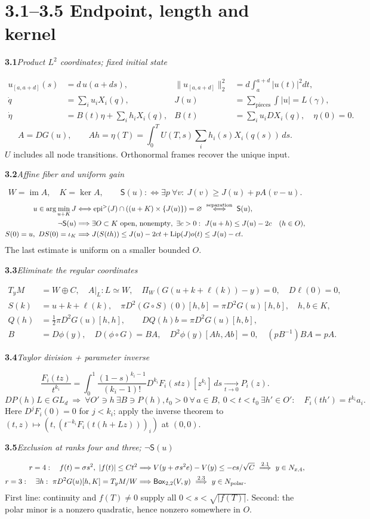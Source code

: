 \documentclass[11pt]{article}
\newcommand{\im}{\operatorname{im}}
\newcommand{\suppc}{\mathsf{S}}
\newcommand{\boxd}{\mathsf{Box}}
\newcommand{\rowhead}[2]{\par\medskip\noindent\textbf{#1}\quad\textit{#2}\par}
\newcommand{\newpart}[1]{\clearpage\section*{#1}}
\begin{document}
\newpart{3.1--3.5 \quad Endpoint, length and kernel}
\rowhead{3.1}{Product $L^2$ coordinates; fixed initial state}
\begin{align*}
 u_{[a,a+d]}(s)&=d\,u(a+ds),&
 \|u_{[a,a+d]}\|_2^2&=d\int_a^{a+d}|u(t)|^2dt,\\
 \dot q&=\sum_i u_iX_i(q),&
 J(u)&=\sum_{\mathrm{pieces}}\int |u|=L(\gamma),\\
 \dot\eta&=B(t)\eta+\sum_i h_i X_i(q),&
 B(t)&=\sum_i u_i DX_i(q),\quad\eta(0)=0 .
\end{align*}
\[ A=DG(u),\qquad Ah=\eta(T)=\int_0^T U(T,s)\sum_i h_i(s)X_i(q(s))\,ds .\]
$U$ includes all node transitions. Orthonormal frames recover the unique input.
\rowhead{3.2}{Affine fiber and uniform gain}
\[
 W=\im A,\quad K=\ker A,\qquad
 \suppc(u):\Longleftrightarrow\exists p\ \forall v:\ J(v)\ge J(u)+pA(v-u).
\]
\begin{align*}
 u\in\arg\min_{u+K}J
 &\Longleftrightarrow
    \operatorname{epi}^{>}(J)\cap((u+K)\times\{J(u)\})=\varnothing
 \ \overset{\rm separation}{\Longleftrightarrow}\ \suppc(u),\\
 \neg\suppc(u)&\Longrightarrow \exists O\subset K\text{ open, nonempty},\
  \exists c>0:\ J(u+h)\le J(u)-2c\quad(h\in O),\\
 S(0)=u,\ DS(0)=\iota_K &\Longrightarrow
 J(S(th))\le J(u)-2ct+\operatorname{Lip}(J)o(t)\le J(u)-ct .
\end{align*}
The last estimate is uniform on a smaller bounded $O$.
\rowhead{3.3}{Eliminate the regular coordinates}
\begin{align*}
 T_yM&=W\oplus C,\quad A|_L:L\simeq W,\quad
 \Pi_W(G(u+k+\ell(k))-y)=0,\quad D\ell(0)=0,\\
 S(k)&=u+k+\ell(k),\quad
 \pi D^2(G\circ S)(0)[h,b]=\pi D^2G(u)[h,b],\quad h,b\in K,\\
 Q(h)&=\tfrac12\pi D^2G(u)[h,h],\qquad DQ(h)b=\pi D^2G(u)[h,b],\\
 B&=D\phi(y),\quad D(\phi\circ G)=BA,\quad
 D^2\phi(y)[Ah,Ab]=0,\quad (pB^{-1})BA=pA .
\end{align*}
\rowhead{3.4}{Taylor division + parameter inverse}
\[
 \frac{F_i(tz)}{t^{k_i}}
 =\int_0^1\frac{(1-s)^{k_i-1}}{(k_i-1)!}D^{k_i}F_i(stz)[z^{k_i}]\,ds
 \xrightarrow[t\to0]{}P_i(z).
\]
\[
 DP(h)L\in GL_d\ \Longrightarrow\
 \forall O'\ni h\ \exists B\ni P(h),t_0>0\ \forall\,a\in B,\ 0<t<t_0\
 \exists h'\in O':\quad F_i(th')=t^{k_i}a_i .
\]
Here $D^jF_i(0)=0$ for $j<k_i$; apply the inverse theorem to
$(t,z)\mapsto(t,(t^{-k_i}F_i(t(h+Lz)))_i)$ at $(0,0)$.
\rowhead{3.5}{Exclusion at ranks four and three; $\neg\suppc(u)$}
\begin{align*}
 r=4:\quad f(t)=\sigma s^2,\ |f(t)|\le Ct^2
 &\Longrightarrow V(y+\sigma s^2e)-V(y)\le-cs/\sqrt C
 \ \overset{2.1}{\Longrightarrow}\ y\in N_{x,4},\\
 r=3:\quad \exists h:\ \pi D^2G(u)[h,K]=T_yM/W
 &\Longrightarrow \boxd_{2,2}(V,y)
 \ \overset{2.3}{\Longrightarrow}\ y\in N_{\rm polar}.
\end{align*}
First line: continuity and $f(T)\ne0$ supply all $0<s<\sqrt{|f(T)|}$.
Second: the polar minor is a nonzero quadratic, hence nonzero somewhere in $O$.
\end{document}
